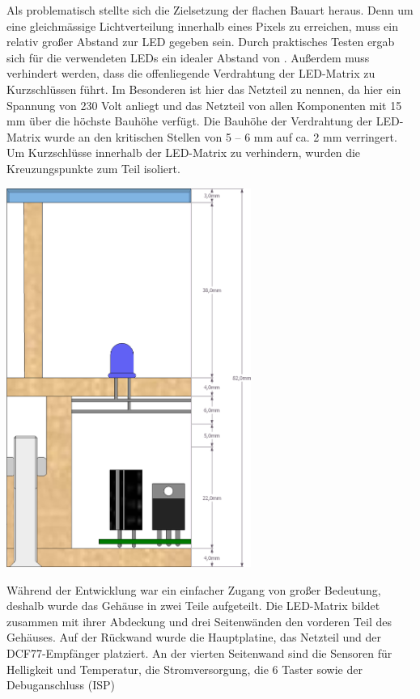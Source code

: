 Als problematisch stellte sich die Zielsetzung der flachen Bauart heraus. Denn um eine gleichmässige Lichtverteilung innerhalb eines Pixels zu erreichen, muss ein relativ großer Abstand zur LED gegeben sein. Durch praktisches Testen ergab sich für die verwendeten LEDs ein idealer Abstand von .%
Außerdem muss verhindert werden, dass die offenliegende Verdrahtung der LED-Matrix zu Kurzschlüssen führt. Im Besonderen ist hier das Netzteil zu nennen, da hier ein Spannung von 230 Volt anliegt und das Netzteil von allen Komponenten mit 15 mm %
über die höchste Bauhöhe verfügt. 
Die Bauhöhe der Verdrahtung der LED-Matrix wurde an den kritischen Stellen von 5 -- 6 mm auf ca. 2 mm verringert. Um Kurzschlüsse innerhalb der LED-Matrix zu verhindern, wurden die Kreuzungspunkte zum Teil isoliert.
\begin{center}
\includegraphics[width=0.6\textwidth]{skizzen/querschnitt.png}
\label{fig_querschnitt}
\end{center}
Während der Entwicklung war ein einfacher Zugang von großer Bedeutung, deshalb wurde das Gehäuse in zwei Teile aufgeteilt. Die LED-Matrix bildet zusammen mit ihrer Abdeckung und drei Seitenwänden den vorderen Teil des Gehäuses. Auf der Rückwand wurde die Hauptplatine, das Netzteil und der DCF77-Empfänger platziert. An der vierten Seitenwand sind die Sensoren für Helligkeit und Temperatur, die Stromversorgung, die 6 Taster sowie der Debuganschluss (ISP) %
